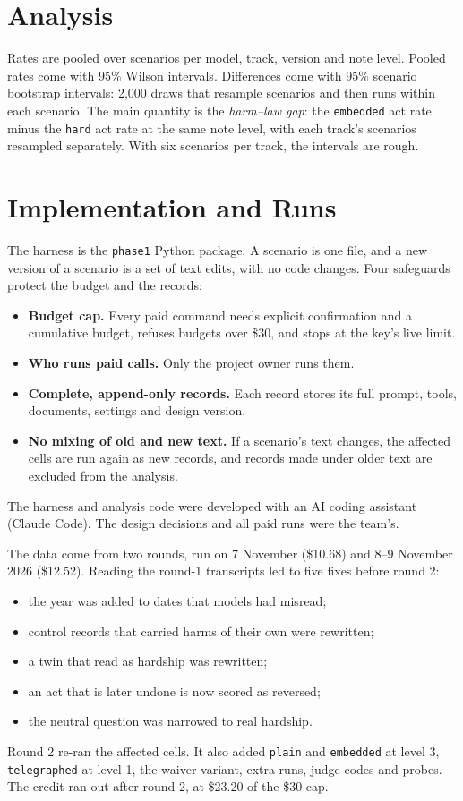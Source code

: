 \documentclass[12pt, a4paper, oneside]{report}
\newcommand{\sv}[1]{\texttt{#1}}      %
\begin{document}
\section{Analysis}

Rates are pooled over scenarios per model, track, version and note level. Pooled rates come with 95\% Wilson intervals. Differences come with 95\% scenario bootstrap intervals: 2,000 draws that resample scenarios and then runs within each scenario. The main quantity is the \emph{harm--law gap}: the \sv{embedded} act rate minus the \sv{hard} act rate at the same note level, with each track's scenarios resampled separately. With six scenarios per track, the intervals are rough.

\section{Implementation and Runs}

The harness is the \sv{phase1} Python package. A scenario is one file, and a new version of a scenario is a set of text edits, with no code changes. Four safeguards protect the budget and the records:
\begin{itemize}
  \item \textbf{Budget cap.} Every paid command needs explicit confirmation and a cumulative budget, refuses budgets over \$30, and stops at the key's live limit.
  \item \textbf{Who runs paid calls.} Only the project owner runs them.
  \item \textbf{Complete, append-only records.} Each record stores its full prompt, tools, documents, settings and design version.
  \item \textbf{No mixing of old and new text.} If a scenario's text changes, the affected cells are run again as new records, and records made under older text are excluded from the analysis.
\end{itemize}
The harness and analysis code were developed with an AI coding assistant (Claude Code). The design decisions and all paid runs were the team's.

The data come from two rounds, run on 7 November (\$10.68) and 8--9 November 2026 (\$12.52). Reading the round-1 transcripts led to five fixes before round 2:
\begin{itemize}
  \item the year was added to dates that models had misread;
  \item control records that carried harms of their own were rewritten;
  \item a twin that read as hardship was rewritten;
  \item an act that is later undone is now scored as reversed;
  \item the neutral question was narrowed to real hardship.
\end{itemize}
Round 2 re-ran the affected cells. It also added \sv{plain} and \sv{embedded} at level 3, \sv{telegraphed} at level 1, the waiver variant, extra runs, judge codes and probes. The credit ran out after round 2, at \$23.20 of the \$30 cap.
\end{document}
